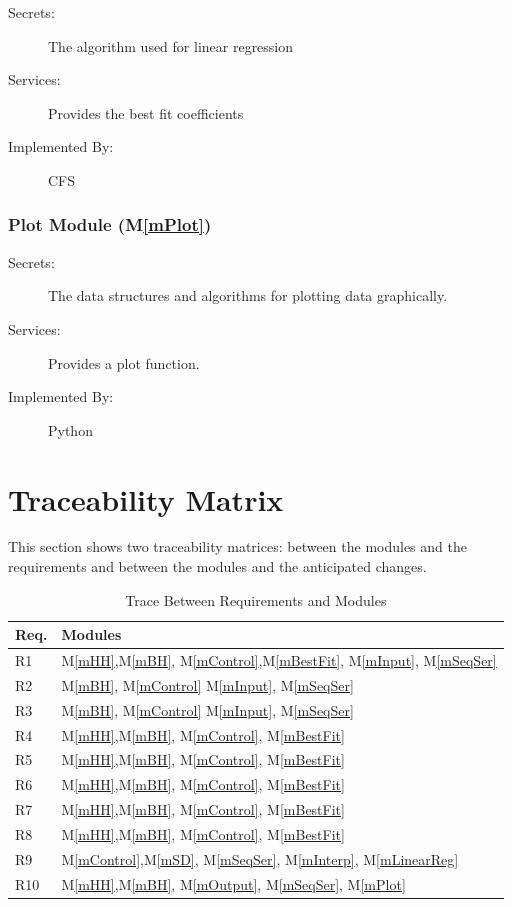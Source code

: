 \documentclass[12pt, titlepage]{article}
\newcommand{\mref}[1]{M\ref{#1}}
\newcommand{\famname}{CFS} %
\begin{document}
\begin{description}
	\item[Secrets:] The algorithm used for linear regression
	\item[Services:] Provides the best fit coefficients
	\item[Implemented By:] \famname{}
\end{description}


\subsubsection{Plot Module (\mref{mPlot})}

\begin{description}
	\item[Secrets:] The data structures and algorithms for plotting data graphically.
	\item[Services:] Provides a plot function.
	\item[Implemented By:] Python
\end{description}

\section{Traceability Matrix} \label{SecTM}

This section shows two traceability matrices: between the modules and the
requirements and between the modules and the anticipated changes.

\begin{table}[H]
\centering
\begin{tabular}{p{} p{}}
\toprule
\textbf{Req.} & \textbf{Modules}\\
\midrule
R1 & \mref{mHH},\mref{mBH}, \mref{mControl},\mref{mBestFit}, \mref{mInput}, \mref{mSeqSer} \\
R2 & \mref{mBH}, \mref{mControl} \mref{mInput}, \mref{mSeqSer}\\
R3 & \mref{mBH}, \mref{mControl} \mref{mInput}, \mref{mSeqSer}\\
R4 & \mref{mHH},\mref{mBH}, \mref{mControl}, \mref{mBestFit}\\
R5 & \mref{mHH},\mref{mBH}, \mref{mControl}, \mref{mBestFit}\\ 
R6 & \mref{mHH},\mref{mBH}, \mref{mControl}, \mref{mBestFit}\\
R7 & \mref{mHH},\mref{mBH}, \mref{mControl}, \mref{mBestFit}\\
R8 & \mref{mHH},\mref{mBH}, \mref{mControl}, \mref{mBestFit}\\
R9 & \mref{mControl},\mref{mSD}, \mref{mSeqSer}, \mref{mInterp}, \mref{mLinearReg}\\
R10 & \mref{mHH},\mref{mBH}, \mref{mOutput}, \mref{mSeqSer}, \mref{mPlot}\\

\bottomrule
\end{tabular}
\caption{Trace Between Requirements and Modules}
\label{TblRT}
\end{table}
\end{document}

